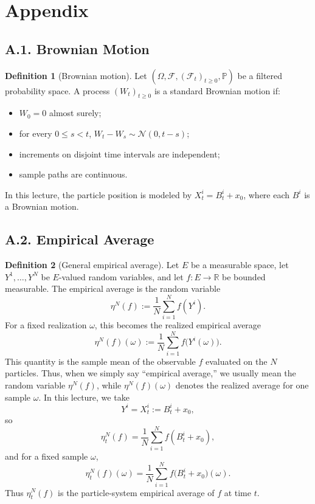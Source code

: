 \documentclass[11pt]{article}
\theoremstyle{definition}
\newtheorem{definition}{Definition}
\theoremstyle{remark}
\begin{document}
\section*{Appendix}
\subsection*{A.1. Brownian Motion}
\begin{definition}[Brownian motion]
Let $(\Omega,\mathcal F,(\mathcal F_t)_{t\ge0},\mathbb P)$ be a filtered probability space. A process $(W_t)_{t\ge0}$ is a standard Brownian motion if:
\begin{itemize}
\item $W_0=0$ almost surely;
\item for every $0\le s<t$, $W_t-W_s\sim\mathcal N(0,t-s)$;
\item increments on disjoint time intervals are independent;
\item sample paths are continuous.
\end{itemize}
In this lecture, the particle position is modeled by $X_t^i=B_t^i+x_0$, where each $B^i$ is a Brownian motion.
\end{definition}

\subsection*{A.2. Empirical Average}
\begin{definition}[General empirical average]
Let $E$ be a measurable space, let $Y^1,\dots,Y^N$ be $E$-valued random variables, and let $f:E\to\mathbb R$ be bounded measurable. The empirical average is the random variable
\[
\eta^N(f):=\frac{1}{N}\sum_{i=1}^N f(Y^i).
\]
For a fixed realization $\omega$, this becomes the realized empirical average
\[
\eta^N(f)(\omega):=\frac{1}{N}\sum_{i=1}^N f\bigl(Y^i(\omega)\bigr).
\]
This quantity is the sample mean of the observable $f$ evaluated on the $N$ particles. Thus, when we simply say ``empirical average,'' we usually mean the random variable $\eta^N(f)$, while $\eta^N(f)(\omega)$ denotes the realized average for one sample $\omega$.
In this lecture, we take
\[
Y^i=X_t^i:=B_t^i+x_0,
\]
so
\[
\eta_t^N(f)=\frac{1}{N}\sum_{i=1}^N f(B_t^i+x_0),
\]
and for a fixed sample $\omega$,
\[
\eta_t^N(f)(\omega)=\frac{1}{N}\sum_{i=1}^N f\bigl(B_t^i+x_0\bigr)(\omega).
\]
Thus $\eta_t^N(f)$ is the particle-system empirical average of $f$ at time $t$.
\end{definition}
\end{document}
